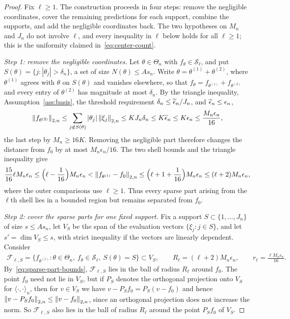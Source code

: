 \begin{proof}
Fix $\ell\geq1$. The construction proceeds in four steps: remove the negligible coordinates, cover the remaining predictions for each support, combine the supports, and add the negligible coordinates back. The two hypotheses on $M_n$ and $J_n$ do not involve $\ell$, and every inequality in $\ell$ below holds for all $\ell\geq1$; this is the uniformity claimed in~\eqref{eq:center-count}.

\smallskip\noindent\emph{Step 1: remove the negligible coordinates.}
Let $\theta\in\Theta_n$ with $f_\theta\in\mathcal S_\ell$, and put $S(\theta)=\{j:|\theta_j|>\delta_n\}$, a set of size $N(\theta)\leq As_n$. Write $\theta=\theta^{(1)}+\theta^{(2)}$, where $\theta^{(1)}$ agrees with $\theta$ on $S(\theta)$ and vanishes elsewhere, so that $f_\theta=f_{\theta^{(1)}}+f_{\theta^{(2)}}$ and every entry of $\theta^{(2)}$ has magnitude at most $\delta_n$. By the triangle inequality, Assumption~\ref{ass:basis}, the threshold requirement $\delta_n\leq\widetilde{\epsilon}_n/J_n$, and $\widetilde{\epsilon}_n\leq\epsilon_n$,
\begin{align}
\left\lVert f_{\theta^{(2)}} \right\rVert_{2,n}
\leq\sum_{j\notin S(\theta)}|\theta_j|\left\lVert \xi_j \right\rVert_{2,n}
\leq KJ_n\delta_n
\leq K\widetilde{\epsilon}_n\leq K\epsilon_n
\leq\frac{M_n\epsilon_n}{16},
\label{eq:negligible-part}
\end{align}
the last step by $M_n\geq16K$. Removing the negligible part therefore changes the distance from $f_0$ by at most $M_n\epsilon_n/16$. The two shell bounds and the triangle inequality give
\begin{align}
\frac{15}{16}\ell M_n\epsilon_n
\leq\Big(\ell-\frac1{16}\Big)M_n\epsilon_n
<\left\lVert f_{\theta^{(1)}}-f_0 \right\rVert_{2,n}
\leq\Big(\ell+1+\frac1{16}\Big)M_n\epsilon_n
\leq(\ell+2)M_n\epsilon_n,
\label{eq:sparse-part-bounds}
\end{align}
where the outer comparisons use $\ell\geq1$. Thus every sparse part arising from the $\ell$th shell lies in a bounded region but remains separated from $f_0$.

\smallskip\noindent\emph{Step 2: cover the sparse parts for one fixed support.}
Fix a support $S\subset\{1,\ldots,J_n\}$ of size $s\leq As_n$, let $V_S$ be the span of the evaluation vectors $\{\xi_j:j\in S\}$, and let $s'=\dim V_S\leq s$, with strict inequality if the vectors are linearly dependent. Consider
\begin{align*}
\mathcal F_{\ell,S}
=\{f_{\theta^{(1)}}:\theta\in\Theta_n,\ f_\theta\in\mathcal S_\ell,\ S(\theta)=S\}
\subset V_S,
\qquad
R_\ell=(\ell+2)M_n\epsilon_n,
\qquad
r_\ell=\frac{\ell M_n\epsilon_n}{16}.
\end{align*}
By~\eqref{eq:sparse-part-bounds}, $\mathcal F_{\ell,S}$ lies in the ball of radius $R_\ell$ around $f_0$. The point $f_0$ need not lie in $V_S$, but if $P_S$ denotes the orthogonal projection onto $V_S$ for $\langle\cdot,\cdot\rangle_n$, then for $v\in V_S$ we have $v-P_Sf_0=P_S(v-f_0)$ and hence $\left\lVert v-P_Sf_0 \right\rVert_{2,n}\leq\left\lVert v-f_0 \right\rVert_{2,n}$, since an orthogonal projection does not increase the norm. So $\mathcal F_{\ell,S}$ also lies in the ball of radius $R_\ell$ around the point $P_Sf_0$ of $V_S$.


\end{proof}
